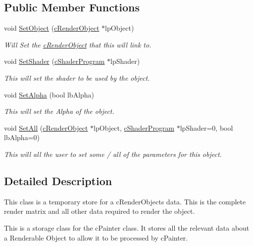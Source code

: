 \subsection*{Public Member Functions}
\begin{DoxyCompactItemize}
\item 
\hypertarget{classc_render_pointer_a896535cf0d3f8282aac2c2a1694f554e}{
void \hyperlink{classc_render_pointer_a896535cf0d3f8282aac2c2a1694f554e}{SetObject} (\hyperlink{classc_render_object}{cRenderObject} $\ast$lpObject)}
\label{classc_render_pointer_a896535cf0d3f8282aac2c2a1694f554e}

\begin{DoxyCompactList}\small\item\em Will Set the \hyperlink{classc_render_object}{cRenderObject} that this will link to. \end{DoxyCompactList}\item 
\hypertarget{classc_render_pointer_a7a20298c7c71e5eada122331d3ea95e5}{
void \hyperlink{classc_render_pointer_a7a20298c7c71e5eada122331d3ea95e5}{SetShader} (\hyperlink{classc_shader_program}{cShaderProgram} $\ast$lpShader)}
\label{classc_render_pointer_a7a20298c7c71e5eada122331d3ea95e5}

\begin{DoxyCompactList}\small\item\em This will set the shader to be used by the object. \end{DoxyCompactList}\item 
\hypertarget{classc_render_pointer_acb4e6f40867bc7f7592ba5c5d500f29e}{
void \hyperlink{classc_render_pointer_acb4e6f40867bc7f7592ba5c5d500f29e}{SetAlpha} (bool lbAlpha)}
\label{classc_render_pointer_acb4e6f40867bc7f7592ba5c5d500f29e}

\begin{DoxyCompactList}\small\item\em This will set the Alpha of the object. \end{DoxyCompactList}\item 
\hypertarget{classc_render_pointer_a7415447aae9ba48f26a8e388a387a252}{
void \hyperlink{classc_render_pointer_a7415447aae9ba48f26a8e388a387a252}{SetAll} (\hyperlink{classc_render_object}{cRenderObject} $\ast$lpObject, \hyperlink{classc_shader_program}{cShaderProgram} $\ast$lpShader=0, bool lbAlpha=0)}
\label{classc_render_pointer_a7415447aae9ba48f26a8e388a387a252}

\begin{DoxyCompactList}\small\item\em This will all the user to set some / all of the parameters for this object. \end{DoxyCompactList}\end{DoxyCompactItemize}


\subsection{Detailed Description}
This class is a temporary store for a cRenderObjects data. This is the complete render matrix and all other data required to render the object. 

This is a storage class for the cPainter class. It stores all the relevant data about a Renderable Object to allow it to be processed by cPainter. 